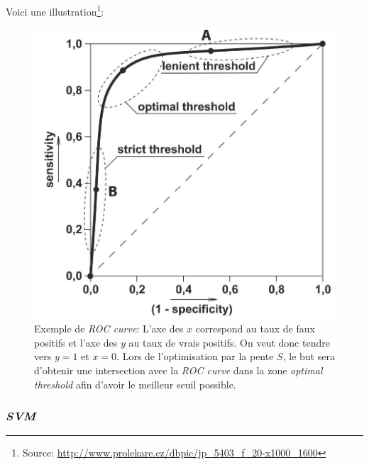 \documentclass[a4paper, 11pt]{article}
\begin{document}
Voici une illustration\footnote{Source: \url{http://www.prolekare.cz/dbpic/jp_5403_f_20-x1000_1600}}:
\begin{figure}[H]
\centering
\includegraphics[scale=0.20]{images/roc_curve}
\caption{Exemple de \textit{ROC curve}: L'axe des $x$ correspond au taux de faux positifs et l'axe des $y$ 
au taux de vrais positifs. On veut donc tendre vers $y = 1$ et $x = 0$. Lors de l'optimisation par la pente $S$, 
le but sera d'obtenir une intersection avec la \textit{ROC curve} dans la zone \textit{optimal threshold} 
afin d'avoir le meilleur seuil possible.}
\end{figure}


\subsubsection{\textit{SVM}}\label{section svm}
\end{document}

